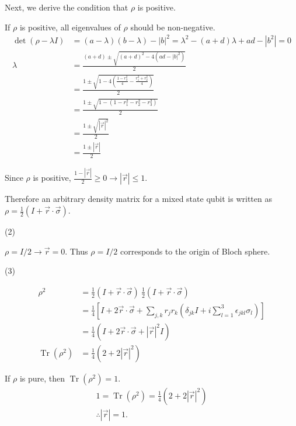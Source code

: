 \documentclass[10pt]{book}
\DeclareMathOperator{\Tr}{Tr}
\begin{document}
	Next, we derive the condition that $\rho$ is positive.
	
	If $\rho$ is positive, all eigenvalues of $\rho$ should be non-negative.
	\begin{equation}
\begin{aligned}
		\det (\rho - \lambda I) &= (a-  \lambda) (b - \lambda) - |b|^2 = \lambda^2 - (a+d)\lambda + ad - |b^2| = 0\\
		\lambda &= \frac{(a+d) \pm \sqrt{(a+d)^2 - 4 (ad - |b|^2)}}{2}\\
		&= \frac{1 \pm \sqrt{1 - 4 \left(\frac{1 - r_3^2}{4} - \frac{r_1^2 + r_2^2}{4} \right)}}{2}\\
		&= \frac{1 \pm \sqrt{1 - (1 - r_1^2 - r_2^2 - r_3^2)}}{2}\\
		&= \frac{1 \pm \sqrt{|\vec{r}|^2}}{2}\\
		&= \frac{1 \pm |\vec{r}|}{2}
	\end{aligned}
\end{equation}
	
	Since $\rho$ is positive, $\frac{1 - |\vec{r}|}{2} \geq 0 \rightarrow |\vec{r}| \leq 1$.
	
	Therefore an arbitrary density matrix for a mixed state qubit is written as $\rho = \frac{1}{2} (I + \vec{r} \cdot \vec{\sigma})$.
	
	\vspace{5mm}
	(2)
	
	$\rho = I / 2 \rightarrow \vec{r}  = 0$. Thus  $\rho = I / 2$ corresponds to the origin of Bloch sphere.
	
	\vspace{5mm}
	(3)
	
	\begin{equation}
\begin{aligned}
		\rho^2 &= \frac{1}{2} (I + \vec{r} \cdot \vec{\sigma})~ \frac{1}{2} (I + \vec{r} \cdot \vec{\sigma})\\
		&= \frac{1}{4} \left[ I + 2 \vec{r}\cdot \vec{\sigma} + \sum_{j,k}r_j r_k \left(\delta_{jk} I + i \sum_{l=1}^3 \epsilon_{jkl}\sigma_l \right)  \right]\\
		&= \frac{1}{4} \left(I + 2 \vec{r}\cdot \vec{\sigma} + |\vec{r}|^2 I \right)\\
		\Tr (\rho^2) &= \frac{1}{4} (2 + 2|\vec{r}|^2)
	\end{aligned}
\end{equation}
	
	If $\rho$ is pure, then $\Tr (\rho^2) = 1$.
	\begin{equation}
\begin{aligned}
		1 =  \Tr (\rho^2) = \frac{1}{4} (2 + 2|\vec{r}|^2)\\
		\therefore |\vec{r}| = 1.
	\end{aligned}
\end{equation}
	
\end{document}
